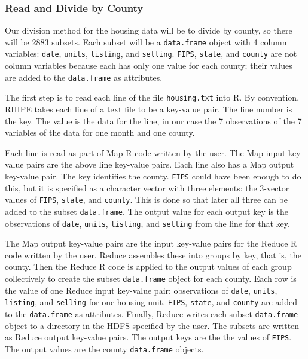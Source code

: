 \subsubsection{Read and Divide by County}
Our division method for the housing data will be to divide by county,
so there will be 2883 subsets. Each subset will be a \texttt{data.frame} object with 4
column variables: \texttt{date}, \texttt{units}, \texttt{listing}, and \texttt{selling}.
\texttt{FIPS}, \texttt{state}, and \texttt{county} are not column variables because each has only one
value for each county; their values are added to the \texttt{data.frame} as
attributes.

The first step is to read each line of the file \texttt{housing.txt} into R. By
convention, RHIPE takes each line of a text file to be a key-value pair.
The line number is the key. The value is the data for the line, in our case
the 7 observations of the 7 variables of the data for one month and one county.

Each line is read as part of Map R code written by the user. The Map input
key-value pairs are the above line key-value pairs. Each line also has a Map
output key-value pair. The key identifies the county. \texttt{FIPS} could have been
enough to do this, but it is specified as a character vector with three
elements: the 3-vector values of \texttt{FIPS}, \texttt{state}, and \texttt{county}.
This is done so that later all three can be added to the subset \texttt{data.frame}.
The output value for each output key is the  observations of \texttt{date}, \texttt{units},
\texttt{listing}, and \texttt{selling} from the line for that key.

The Map output key-value pairs are the input key-value pairs for the Reduce R
code written by the user. Reduce assembles these into groups by key,
that is, the county. Then the Reduce R code is applied to the output
values of  each group collectively to create the subset \texttt{data.frame} object
for each county. Each row is the value of one Reduce input key-value pair:
observations of \texttt{date}, \texttt{units}, \texttt{listing}, and \texttt{selling} for one housing unit.
\texttt{FIPS}, \texttt{state}, and \texttt{county} are added to the \texttt{data.frame} as attributes.
Finally, Reduce writes
each subset \texttt{data.frame} object to a directory in the HDFS specified by the
user.  The subsets are written as Reduce output key-value pairs.
The output keys are the the values of \texttt{FIPS}. The output values are the county
\texttt{data.frame} objects.

